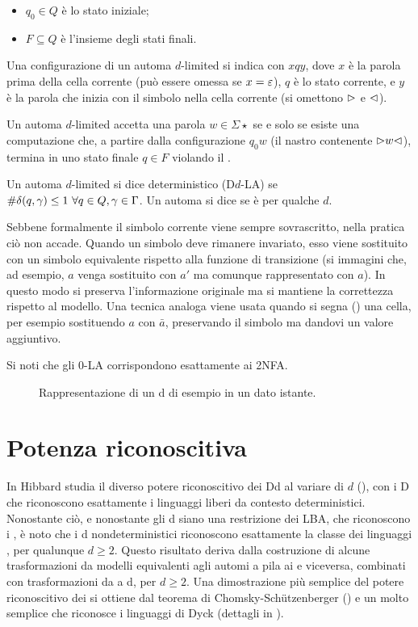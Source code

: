 \begin{defin}
\begin{itemize}
		\item $q_0\in Q$ è lo stato iniziale;
		\item $F\subseteq Q$ è l'insieme degli stati finali.
	\end{itemize}
	Una configurazione di un automa $d$-limited si indica con $xqy$, dove $x$ è la parola prima della cella corrente (può essere omessa se $x=\varepsilon$), $q$ è lo stato corrente, e $y$ è la parola che inizia con il simbolo nella cella corrente (si omettono $\rhd$ e $\lhd$).

	Un automa $d$-limited accetta una parola $w\in\Sigma\star$ se e solo se esiste una computazione che, a partire dalla configurazione $q_0w$ (il nastro contenente $\rhd w\lhd$), termina in uno stato finale $q\in F$ violando il .

	Un automa $d$-limited si dice deterministico (D$d$-LA) se $\# \delta(q,\gamma)\leq 1 ~ \forall q\in Q,\gamma\in\Gamma$. Un automa si dice  se è  per qualche $d$.
\end{defin}
Sebbene formalmente il simbolo corrente viene sempre sovrascritto, nella pratica ciò non accade. Quando un simbolo deve rimanere invariato, esso viene sostituito con un simbolo equivalente rispetto alla funzione di transizione (si immagini che, ad esempio, $a$ venga sostituito con $a'$ ma comunque rappresentato con $a$). In questo modo si preserva l'informazione originale ma si mantiene la correttezza rispetto al modello. Una tecnica analoga viene usata quando si segna () una cella, per esempio sostituendo $a$ con $\bar a$, preservando il simbolo ma dandovi un valore aggiuntivo.

Si noti che gli 0-LA corrispondono esattamente ai 2NFA.

\begin{figure}
	\centering
	
	\caption{Rappresentazione di un \la d di esempio in un dato istante.}
\end{figure}



\section{Potenza riconoscitiva}
In \cite{Hibbard:67:CFdet} Hibbard studia il diverso potere riconoscitivo dei D\la d al variare di $d$ (\cite{Hibbard:67:CFdet}), con i D che riconoscono esattamente i linguaggi liberi da contesto deterministici. Nonostante ciò, e nonostante gli \la d siano una restrizione dei LBA, che riconoscono i , è noto che i \la d nondeterministici riconoscono esattamente la classe dei linguaggi , per qualunque $d\geq2$. Questo risultato deriva dalla costruzione di alcune trasformazioni da modelli equivalenti agli automi a pila ai  e viceversa, combinati con trasformazioni da  a \la d, per $d\geq2$. Una dimostrazione più semplice del potere riconoscitivo dei  si ottiene dal teorema di Chomsky-Schützenberger (\cite{Chomsky:63:algebraCF}) e un  molto semplice che riconosce i linguaggi di Dyck (dettagli in \cite{Pighizzini:19:limited}).

